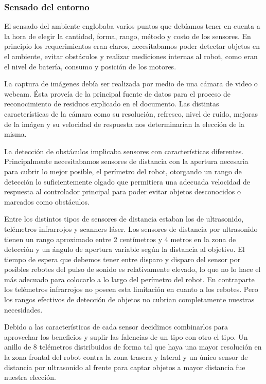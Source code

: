 \subsubsection{Sensado del entorno}
\label{h_ideas_sensado}

El sensado del ambiente englobaba varios puntos que deb\'iamos tener en cuenta a la hora de elegir
la cantidad, forma, rango, m\'etodo y costo de los sensores.
En principio los requerimientos eran claros, necesitabamos poder detectar objetos en el ambiente,
evitar obst\'aculos y realizar mediciones internas al robot, como eran el nivel de bater\'ia,
consumo y posici\'on de los motores.

La captura de im\'agenes deb\'ia ser realizada por medio de una c\'amara de video o webcam.
\'Esta prove\'ia de la principal fuente de datos para el proceso de reconocimiento de residuos
explicado en el documento.
Las distintas caracter\'isticas de la c\'amara como su resoluci\'on, refresco, nivel de ruido,
mejoras de la im\'agen y su velocidad de respuesta nos determinar\'ian la elecci\'on de la misma.

La detecci\'on de obst\'aculos implicaba sensores con caracter\'isticas diferentes.
Principalmente necesitabamos sensores de distancia con la apertura necesaria para cubrir lo
mejor posible, el per\'imetro del robot, otorgando un rango de detecci\'on lo suficientemente olgado
que permitiera una adecuada velocidad de respuesta al controlador principal para poder
evitar objetos desconocidos o marcados como obst\'aculos.

Entre los distintos tipos de sensores de distancia estaban los de ultrasonido, tel\'emetros infrarrojos
y scanners l\'aser.
Los sensores de distancia por ultrasonido tienen un rango aproximado entre 2 cent\'imetros y 4 metros
en la zona de detecci\'on y un \'angulo de apertura variable seg\'un la distancia al objetivo.
El tiempo de espera que debemos tener entre disparo y disparo del sensor por posibles rebotes del pulso
de sonido es relativamente elevado, lo que no lo hace el m\'as adecuado para colocarlo a lo largo del
per\'imetro del robot.
En contraparte los tel\'emetros infrarrojos no poseen esta limitaci\'on en cuanto a los rebotes.
Pero los rangos efectivos de detecci\'on de objetos no cubrian completamente nuestras necesidades.

Debido a las caracter\'isticas de cada sensor decidimos combinarlos para aprovechar los beneficios y
suplir las falencias de un tipo con otro el tipo.
Un anillo de 8 tel\'emetros distribuidos de forma tal que haya una mayor resoluci\'on en la zona frontal
del robot contra la zona trasera y lateral y un \'unico sensor de distancia por ultrasonido al frente
para captar objetos a mayor distancia fue nuestra elecci\'on.

